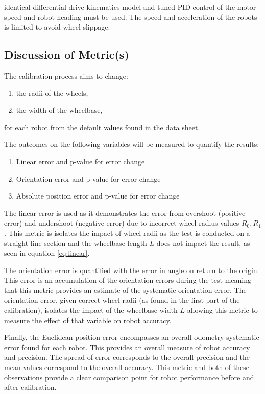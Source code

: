 \documentclass[conference]{IEEEtran}
\begin{document}
identical differential drive kinematics model and tuned PID control of the motor speed and robot heading must be used. 
The speed and acceleration of the robots is limited to avoid wheel slippage.

\subsection{Discussion of Metric(s)}

The calibration process aims to change:
\begin{enumerate}
    \item the radii of the wheels,
    \item the width of the wheelbase,
\end{enumerate}
for each robot from the default values found in the data sheet.

The outcomes on the following variables will be measured to quantify the results:
\begin{enumerate}
    \item Linear error and p-value for error change
    \item Orientation error and p-value for error change
    \item Absolute position error and p-value for error change
\end{enumerate}

The linear error is used as it demonstrates the error from overshoot (positive error) and undershoot (negative error) due to incorrect wheel radius values $R_0, R_1$. This metric is isolates the impact of wheel radii as the test is conducted on a straight line section and the wheelbase length $L$ does not impact the result, as seen in equation \ref{eq:linear}.

The orientation error is quantified with the error in angle on return to the origin. This error is an accumulation of the orientation errors during the test meaning that this metric provides an estimate of the systematic orientation error.
The orientation error, given correct wheel radii (as found in the first part of the calibration), isolates the impact of the wheelbase width $L$ allowing this metric to measure the effect of that variable on robot accuracy.

Finally, the Euclidean position error encompasses an overall odometry systematic error found for each robot. This provides an overall measure of robot accuracy and precision. The spread of error corresponds to the overall precision and the mean values correspond to the overall accuracy. 
This metric and both of these observations provide a clear comparison point for robot performance before and after calibration.
\end{document}
